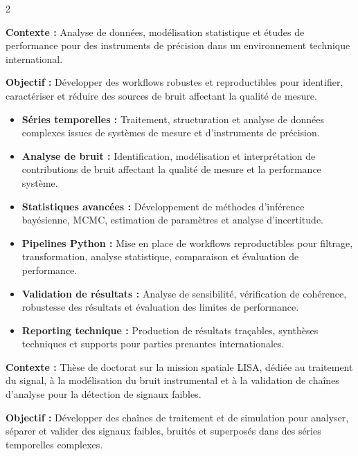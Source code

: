 \documentclass[8pt,a4paper,ragged2e,withhyper]{altacv}
\begin{document}
\begin{paracol}{2}
\divider


\textbf{Contexte :} Analyse de données, modélisation statistique et études de performance pour des instruments de précision dans un environnement technique international.

\textbf{Objectif :} Développer des workflows robustes et reproductibles pour identifier, caractériser et réduire des sources de bruit affectant la qualité de mesure.

\begin{itemize}
  \item \textbf{Séries temporelles :} Traitement, structuration et analyse de données complexes issues de systèmes de mesure et d’instruments de précision.
  \item \textbf{Analyse de bruit :} Identification, modélisation et interprétation de contributions de bruit affectant la qualité de mesure et la performance système.
  \item \textbf{Statistiques avancées :} Développement de méthodes d’inférence bayésienne, MCMC, estimation de paramètres et analyse d’incertitude.
  \item \textbf{Pipelines Python :} Mise en place de workflows reproductibles pour filtrage, transformation, analyse statistique, comparaison et évaluation de performance.
  \item \textbf{Validation de résultats :} Analyse de sensibilité, vérification de cohérence, robustesse des résultats et évaluation des limites de performance.
  \item \textbf{Reporting technique :} Production de résultats traçables, synthèses techniques et supports pour parties prenantes internationales.
\end{itemize}

\divider


\textbf{Contexte :} Thèse de doctorat sur la mission spatiale LISA, dédiée au traitement du signal, à la modélisation du bruit instrumental et à la validation de chaînes d’analyse pour la détection de signaux faibles.

\textbf{Objectif :} Développer des chaînes de traitement et de simulation pour analyser, séparer et valider des signaux faibles, bruités et superposés dans des séries temporelles complexes.


\end{paracol}
\end{document}
